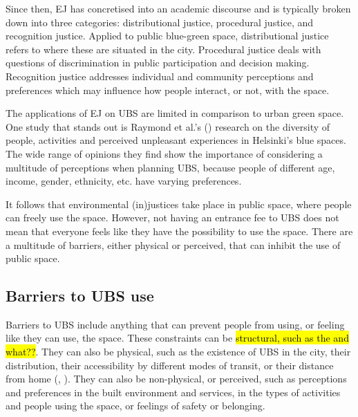 \documentclass{article}
\begin{document}
Since then, EJ has concretised into an academic discourse and is typically broken down into three categories: distributional justice, procedural justice, and recognition justice.
Applied to public blue-green space, distributional justice refers to where these are situated in the city.
Procedural justice deals with questions of discrimination in public participation and decision making. 
Recognition justice addresses individual and community perceptions and preferences which may influence how people interact, or not, with the space.

The applications of EJ on UBS are limited in comparison to urban green space. One study that stands out is Raymond et al.'s (\citeyear{raymond2016integrating}) research on the diversity of people, activities and perceived unpleasant experiences in Helsinki's blue spaces. The wide range of opinions they find show the importance of considering a multitude of perceptions when planning UBS, because people of different age, income, gender, ethnicity, etc. have varying preferences.

It follows that environmental (in)justices take place in public space, where people can freely use the space. However, not having an entrance fee to UBS does not mean that everyone feels like they have the possibility to use the space. There are a multitude of barriers, either physical or perceived, that can inhibit the use of public space.

\subsection{Barriers to UBS use}

Barriers to UBS include anything that can prevent people from using, or feeling like they can use, the space. These constraints can be \hl{structural, such as the  and what??}. 
They can also be physical, such as the existence of UBS in the city, their distribution, their accessibility by different modes of transit, or their distance from home (\cite{REF}, \cite{REF}). They can also be non-physical, or perceived, such as perceptions and preferences in the built environment and services, in the types of activities and people using the space, or feelings of safety or belonging.
\end{document}
